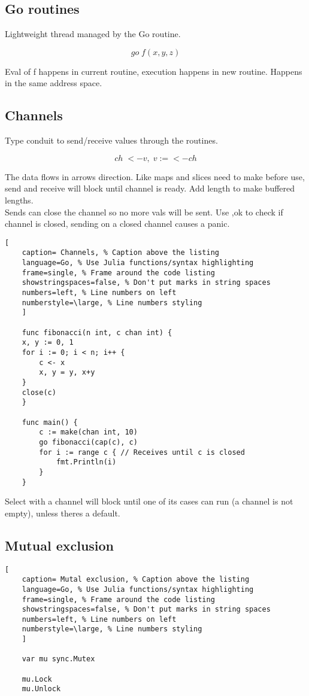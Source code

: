 \documentclass[11pt]{scrartcl} %
\begin{document}
\subsection{Go routines}

Lightweight thread managed by the Go routine.

\[ go\;f(x,y,z) \]

Eval of f happens in current routine, execution happens in new routine. Happens in the 
same address space.

\subsection{Channels}

Type conduit to send/receive values through the routines.

\[ ch\;<-v,\;v:=<-ch \]

The data flows in arrows direction. Like maps and slices need to make before use, send
and receive will block until channel is ready. Add length to make buffered lengths.\\

Sends can close the channel so no more vals will be sent. Use ,ok to check if channel is closed,
sending on a closed channel causes a panic.

\begin{lstlisting}[
	caption= Channels, % Caption above the listing
	language=Go, % Use Julia functions/syntax highlighting
	frame=single, % Frame around the code listing
	showstringspaces=false, % Don't put marks in string spaces
	numbers=left, % Line numbers on left
	numberstyle=\large, % Line numbers styling
	]

	func fibonacci(n int, c chan int) {
	x, y := 0, 1
	for i := 0; i < n; i++ {
		c <- x
		x, y = y, x+y
	}
	close(c)
	}

	func main() {
		c := make(chan int, 10)
		go fibonacci(cap(c), c)
		for i := range c { // Receives until c is closed
			fmt.Println(i)
		}
	}

\end{lstlisting}

Select with a channel will block until one of its cases can run (a channel is not empty), 
unless theres a default.

\subsection{Mutual exclusion}

\begin{lstlisting}[
	caption= Mutal exclusion, % Caption above the listing
	language=Go, % Use Julia functions/syntax highlighting
	frame=single, % Frame around the code listing
	showstringspaces=false, % Don't put marks in string spaces
	numbers=left, % Line numbers on left
	numberstyle=\large, % Line numbers styling
	]

	var mu sync.Mutex

	mu.Lock
	mu.Unlock 

\end{lstlisting}
\end{document}
